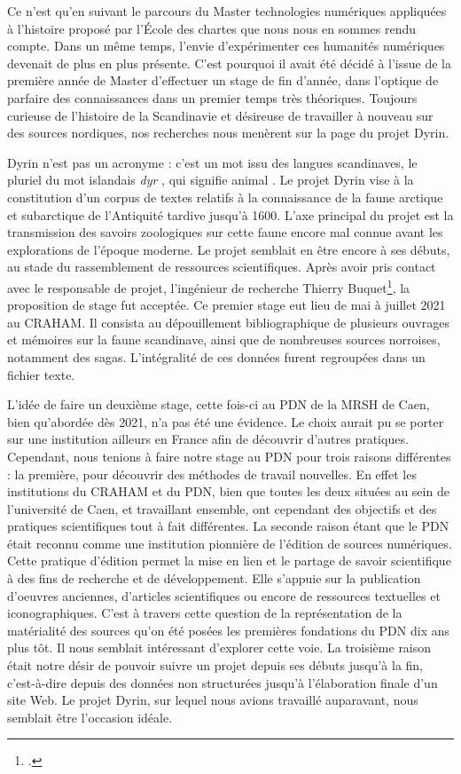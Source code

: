 \documentclass[a4paper,12pt,twoside]{book}
\begin{document}
Ce n'est qu'en suivant le parcours du Master technologies numériques appliquées à l'histoire proposé par l'École des chartes que nous nous en sommes rendu compte. Dans un même temps, l'envie d'expérimenter ces humanités numériques devenait de plus en plus présente. C'est pourquoi il avait été décidé à l'issue de la première année de Master d'effectuer un stage de fin d'année, dans l'optique de parfaire des connaissances dans un premier temps très théoriques. Toujours curieuse de l'histoire de la Scandinavie et désireuse de travailler à nouveau sur des sources nordiques, nos recherches nous menèrent sur la page du projet Dyrin.

Dyrin n'est pas un acronyme : c'est un mot issu des langues scandinaves, le pluriel du mot islandais \og \textit{dyr} \fg, qui signifie \og animal \fg. Le projet Dyrin vise à la constitution d'un corpus de textes relatifs à la connaissance de la faune arctique et subarctique de l'Antiquité tardive jusqu'à 1600. L'axe principal du projet est la transmission des savoirs zoologiques sur cette faune encore mal connue avant les explorations de l'époque moderne. Le projet semblait en être encore à ses débuts, au stade du rassemblement de ressources scientifiques.
Après avoir pris contact avec le responsable de projet, l'ingénieur de recherche Thierry Buquet\footcite{buquet_thierry_nodate}, la proposition de stage fut acceptée. Ce premier stage eut lieu de mai à juillet 2021 au \acrfull{CRAHAM}. Il consista au dépouillement bibliographique de plusieurs ouvrages et mémoires sur la faune scandinave, ainsi que de nombreuses sources norroises, notamment des sagas. L'intégralité de ces données furent regroupées dans un fichier texte.

L'idée de faire un deuxième stage, cette fois-ci au \acrlong{PDN} de la \acrlong{MRSH} de Caen, bien qu'abordée dès 2021, n'a pas été une évidence. Le choix aurait pu se porter sur une institution ailleurs en France afin de découvrir d'autres pratiques. Cependant, nous tenions à faire notre stage au \acrshort{PDN} pour trois raisons différentes : la première, pour découvrir des méthodes de travail nouvelles. En effet les institutions du \acrshort{CRAHAM} et du \acrshort{PDN}, bien que toutes les deux situées au sein de l'université de Caen, et travaillant ensemble, ont cependant des objectifs et des pratiques scientifiques tout à fait différentes. La seconde raison étant que le \acrshort{PDN} était reconnu comme une institution pionnière de l'édition de sources numériques. Cette pratique d'édition permet la mise en lien et le partage de savoir scientifique à des fins de recherche et de développement. Elle s'appuie sur la publication d'oeuvres anciennes, d'articles scientifiques ou encore de ressources textuelles et iconographiques. C'est à travers cette question de la représentation de la matérialité des sources qu'on été posées les premières fondations du \acrshort{PDN} dix ans plus tôt. Il nous semblait intéressant d'explorer cette voie. La troisième raison était notre désir de pouvoir suivre un projet depuis ses débuts jusqu'à la fin, c'est-à-dire depuis des données non structurées jusqu'à l'élaboration finale d'un site Web. Le projet Dyrin, sur lequel nous avions travaillé auparavant, nous semblait être l'occasion idéale.
\end{document}
